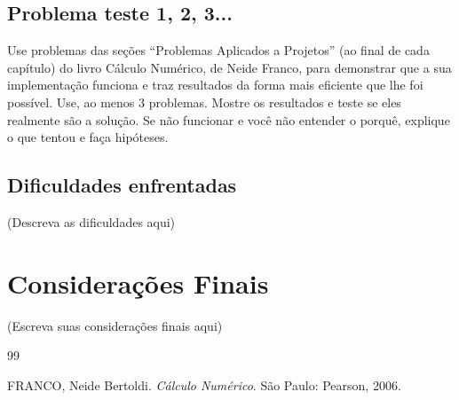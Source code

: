 \documentclass[a4paper,12pt]{article}
\begin{document}
\subsection{Problema teste 1, 2, 3...}
Use problemas das seções “Problemas Aplicados a Projetos” (ao final de cada capítulo) do livro Cálculo Numérico, de Neide Franco, para demonstrar que a sua implementação funciona e traz resultados da forma mais eficiente que lhe foi possível. Use, ao menos 3 problemas. Mostre os resultados e teste se eles realmente são a solução. Se não funcionar e você não entender o porquê, explique o que tentou e faça hipóteses.

\subsection{Dificuldades enfrentadas}
(Descreva as dificuldades aqui)

\newpage
\section{Considerações Finais}
(Escreva suas considerações finais aqui)

\newpage
\begin{thebibliography}{99}

FRANCO, Neide Bertoldi. \emph{Cálculo Numérico}. São Paulo: Pearson, 2006.


\end{thebibliography}
\end{document}

